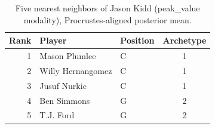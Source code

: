 \begin{table}[htbp]
  \centering\small
  \begin{tabular}{rllc}
    \toprule
    Rank & Player & Position & Archetype \\
    \midrule
    1 & Mason Plumlee & C & 1 \\
    2 & Willy Hernangomez & C & 1 \\
    3 & Jusuf Nurkic & C & 1 \\
    4 & Ben Simmons & G & 2 \\
    5 & T.J. Ford & G & 2 \\
    \bottomrule
  \end{tabular}
  \caption{Five nearest neighbors of Jason Kidd (peak_value modality), Procrustes-aligned posterior mean.}
  \label{tab:Jason_Kidd_neighbors_peak_value}
\end{table}

